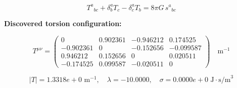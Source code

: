 
\begin{equation}
  T^a{}_{bc} + \delta^a_b T_c - \delta^a_c T_b = 8\pi G \, s^a{}_{bc}
\end{equation}

\textbf{Discovered torsion configuration:}

\begin{equation}
  T^{\mu\nu} = \begin{pmatrix}
    0 & 0.902361 & -0.946212 & 0.174525 \\
    -0.902361 & 0 & -0.152656 & -0.099587 \\
    0.946212 & 0.152656 & 0 & 0.020511 \\
    -0.174525 & 0.099587 & -0.020511 & 0
  \end{pmatrix} \quad \text{m}^{-1}
\end{equation}

\begin{equation}
  |T| = 1.3318e+0 \text{ m}^{-1}, \quad
  \lambda = -10.0000, \quad
  \sigma = 0.0000e+0 \text{ J}\cdot\text{s/m}^3
\end{equation}